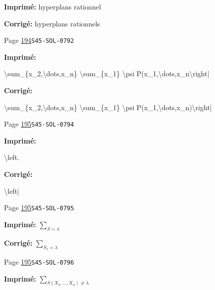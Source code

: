 \documentclass[oneside]{book}
\theoremstyle{sga-source}
\theoremstyle{sga-source-dash}
\theoremstyle{sga-source-dotdash}
\theoremstyle{sga-source-number-note-dash}
\theoremstyle{sga-source-note-number-dotdash}
\theoremstyle{sga-source-example-dotdash}
\theoremstyle{sga-source-inline-number}
\theoremstyle{sga-source-bare-number}
\theoremstyle{sga-source}
\begin{document}
\begin{description}
\par\noindent\textbf{Imprimé:} hyperplans rationnel
\par\noindent\textbf{Corrigé:} hyperplans rationnels
\smallskip
\item[\hypertarget{apparatus:FR-0171}{171}] Page \hyperlink{printpage:fr:194}{194}\quad\texttt{S45-SOL-0792}
\par\noindent\textbf{Imprimé:} {\footnotesize\ttfamily\raggedright \textbackslash{}\allowbreak{}sum\_\allowbreak{}\{\allowbreak{}x\_\allowbreak{}2,\allowbreak{}\textbackslash{}\allowbreak{}dots,\allowbreak{}x\_\allowbreak{}n\}\allowbreak{} \textbackslash{}\allowbreak{}sum\_\allowbreak{}\{\allowbreak{}x\_\allowbreak{}1\}\allowbreak{} \textbackslash{}\allowbreak{}psi P(\allowbreak{}x\_\allowbreak{}1,\allowbreak{}\textbackslash{}\allowbreak{}dots,\allowbreak{}x\_\allowbreak{}n\textbackslash{}\allowbreak{}right|\par}
\par\noindent\textbf{Corrigé:} {\footnotesize\ttfamily\raggedright \textbackslash{}\allowbreak{}sum\_\allowbreak{}\{\allowbreak{}x\_\allowbreak{}2,\allowbreak{}\textbackslash{}\allowbreak{}dots,\allowbreak{}x\_\allowbreak{}n\}\allowbreak{} \textbackslash{}\allowbreak{}sum\_\allowbreak{}\{\allowbreak{}x\_\allowbreak{}1\}\allowbreak{} \textbackslash{}\allowbreak{}psi P(\allowbreak{}x\_\allowbreak{}1,\allowbreak{}\textbackslash{}\allowbreak{}dots,\allowbreak{}x\_\allowbreak{}n)\allowbreak{}\textbackslash{}\allowbreak{}right|\par}
\smallskip
\item[\hypertarget{apparatus:FR-0172}{172}] Page \hyperlink{printpage:fr:195}{195}\quad\texttt{S45-SOL-0794}
\par\noindent\textbf{Imprimé:} {\footnotesize\ttfamily\raggedright \textbackslash{}\allowbreak{}left.\par}
\par\noindent\textbf{Corrigé:} {\footnotesize\ttfamily\raggedright \textbackslash{}\allowbreak{}left|\par}
\smallskip
\item[\hypertarget{apparatus:FR-0173}{173}] Page \hyperlink{printpage:fr:195}{195}\quad\texttt{S45-SOL-0795}
\par\noindent\textbf{Imprimé:} \(\sum_{S=\lambda}\)
\par\noindent\textbf{Corrigé:} \(\sum_{S_1=\lambda}\)
\smallskip
\item[\hypertarget{apparatus:FR-0174}{174}] Page \hyperlink{printpage:fr:195}{195}\quad\texttt{S45-SOL-0796}
\par\noindent\textbf{Imprimé:} \(\sum_{S(X_2,\dots,X_n)\ne\lambda}\)

\end{description}
\end{document}
